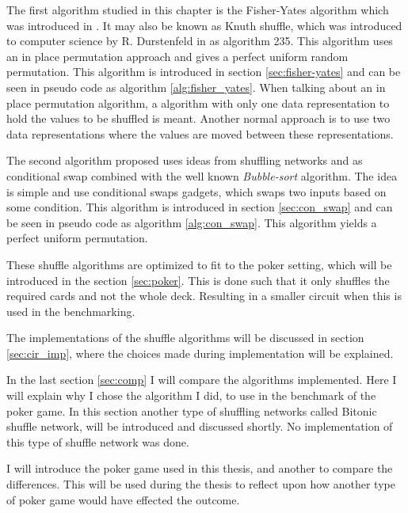 \documentclass[twoside,11pt,openright]{report}
\begin{document}
The first algorithm studied in this chapter is the Fisher-Yates algorithm which was introduced in \cite{fisher_yates}. It may also be known as Knuth shuffle, which was introduced to computer science by R. Durstenfeld in \cite{durstenfeld} as algorithm 235. This algorithm uses an in place permutation approach and gives a perfect uniform random permutation. This algorithm is introduced in section \ref{sec:fisher-yates} and can be seen in pseudo code as algorithm \ref{alg:fisher_yates}. When talking about an in place permutation algorithm, a algorithm with only one data representation to hold the values to be shuffled is meant. Another normal approach is to use two data representations where the values are moved between these representations.

The second algorithm proposed uses ideas from shuffling networks and \cite{psi} as conditional swap combined with the well known \textit{Bubble-sort} algorithm. The idea is simple and use conditional swaps gadgets, which swaps two inputs based on some condition. This algorithm is introduced in section \ref{sec:con_swap} and can be seen in pseudo code as algorithm \ref{alg:con_swap}. This algorithm yields a perfect uniform permutation.

These shuffle algorithms are optimized to fit to the poker setting, which will be introduced in the section \ref{sec:poker}. This is done such that it only shuffles the required cards and not the whole deck. Resulting in a smaller circuit when this is used in the benchmarking.

The implementations of the shuffle algorithms will be discussed in section \ref{sec:cir_imp}, where the choices made during implementation will be explained.

In the last section \ref{sec:comp} I will compare the algorithms implemented. Here I will explain why I chose the algorithm I did, to use in the benchmark of the poker game. In this section another type of shuffling networks called Bitonic shuffle network, will be introduced and discussed shortly. No implementation of this type of shuffle network was done.

\bigskip

I will introduce the poker game used in this thesis, and another to compare the differences. This will be used during the thesis to reflect upon how another type of poker game would have effected the outcome.

\end{document}
